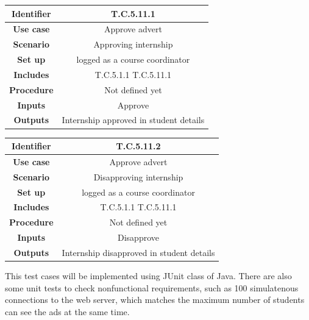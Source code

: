 \documentclass{l3deliverable}
\begin{document}
\begin{tabular}{|c|c|}
\hline \textbf{Identifier} & T.C.5.11.1\\
\hline \textbf{Use case} & Approve advert\\
\hline \textbf{Scenario} & Approving internship\\
\hline \textbf{Set up} & logged as a course coordinator\\
\hline \textbf{Includes} & T.C.5.1.1 T.C.5.11.1\\
\hline \textbf{Procedure} & Not defined yet\\
\hline \textbf{Inputs} & Approve\\
\hline \textbf{Outputs} & Internship approved in student details\\
\hline
\end{tabular}

\begin{tabular}{|c|c|}
\hline \textbf{Identifier} & T.C.5.11.2\\
\hline \textbf{Use case} & Approve advert\\
\hline \textbf{Scenario} & Disapproving internship\\
\hline \textbf{Set up} & logged as a course coordinator\\
\hline \textbf{Includes} & T.C.5.1.1 T.C.5.11.1\\
\hline \textbf{Procedure} & Not defined yet\\
\hline \textbf{Inputs} & Disapprove\\
\hline \textbf{Outputs} & Internship disapproved in student details\\
\hline
\end{tabular}

This test cases will be implemented using JUnit class of Java. There are also some unit tests to check nonfunctional requirements, such as 100 simulatenous connections to the web server, which matches the maximum number of students can see the ads at the same time.\\
\end{document}
